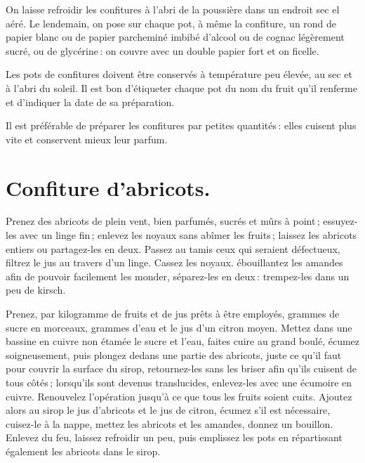 \medskip

On laisse refroidir les confitures à l'abri de la poussière dans un endroit sec
el aéré. Le lendemain, on pose sur chaque pot, à même la confiture, un rond de
papier blanc ou de papier parcheminé imbibé d'alcool ou de cognac légèrement
sucré, ou de glycérine : on couvre avec un double papier fort et on ficelle.

Les pots de confitures doivent être conservés à température peu élevée, au sec
et à l'abri du soleil. Il est bon d'étiqueter chaque pot du nom du fruit qu'il
renferme et d'indiquer la date de sa préparation.

\medskip

Il est préférable de préparer les confitures par petites quantités : elles
cuisent plus vite et conservent mieux leur parfum.

\section*{\centering Confiture d'abricots.}
{}

Prenez des abricots de plein vent, bien parfumés, sucrés et mûrs à point ;
essuyez-les avec un linge fin ; enlevez les noyaux sans abîmer les fruits ;
laissez les abricots entiers ou partagez-les en deux. Passez au tamis ceux qui
seraient défectueux, filtrez le jus au travers d'un linge. Cassez les noyaux.
ébouillantez les amandes afin de pouvoir facilement les monder, séparez-les en
deux : trempez-les dans un peu de kirsch.

Prenez, par kilogramme de fruits et de jus prêts à être employés, {\mmm}
grammes de sucre en morceaux, {\mmm} grammes d'eau et le jus d'un citron
moyen. Mettez dans une bassine en cuivre non étamée le sucre et l'eau, faites
cuire au grand boulé, écumez soigneusement, puis plongez dedans une partie des
abricots, juste ce qu'il faut pour couvrir la surface du sirop, retournez-les
sans les briser afin qu'ils cuisent de tous côtés ; lorsqu'ils sont devenus
translucides, enlevez-les avec une écumoire en cuivre. Renouvelez l'opération
jusqu'à ce que tous les fruits soient cuits. Ajoutez alors au sirop le jus
d'abricots et le jus de citron, écumez s'il est nécessaire, cuisez-le à la
nappe, mettez les abricots et les amandes, donnez un bouillon. Enlevez du feu,
laissez refroidir un peu, puis emplissez les pots en répartissant également les
abricots dans le sirop.

